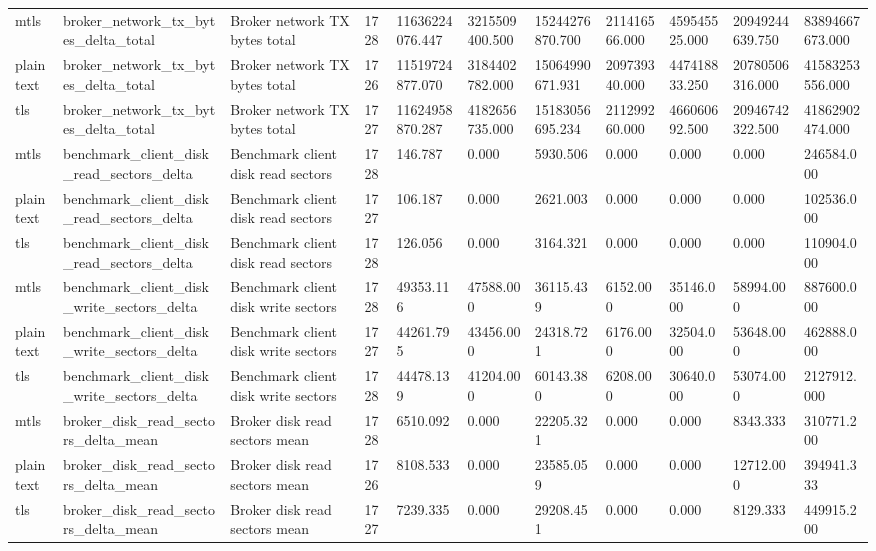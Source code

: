 \begin{longtable}{lllllllllll}
mtls & broker\_network\_tx\_bytes\_delta\_total & Broker network TX bytes total & 1728 & 11636224076.447 & 3215509400.500 & 15244276870.700 & 211416566.000 & 459545525.000 & 20949244639.750 & 83894667673.000 \\
plaintext & broker\_network\_tx\_bytes\_delta\_total & Broker network TX bytes total & 1726 & 11519724877.070 & 3184402782.000 & 15064990671.931 & 209739340.000 & 447418833.250 & 20780506316.000 & 41583253556.000 \\
tls & broker\_network\_tx\_bytes\_delta\_total & Broker network TX bytes total & 1727 & 11624958870.287 & 4182656735.000 & 15183056695.234 & 211299260.000 & 466060692.500 & 20946742322.500 & 41862902474.000 \\
mtls & benchmark\_client\_disk\_read\_sectors\_delta & Benchmark client disk read sectors & 1728 & 146.787 & 0.000 & 5930.506 & 0.000 & 0.000 & 0.000 & 246584.000 \\
plaintext & benchmark\_client\_disk\_read\_sectors\_delta & Benchmark client disk read sectors & 1727 & 106.187 & 0.000 & 2621.003 & 0.000 & 0.000 & 0.000 & 102536.000 \\
tls & benchmark\_client\_disk\_read\_sectors\_delta & Benchmark client disk read sectors & 1728 & 126.056 & 0.000 & 3164.321 & 0.000 & 0.000 & 0.000 & 110904.000 \\
mtls & benchmark\_client\_disk\_write\_sectors\_delta & Benchmark client disk write sectors & 1728 & 49353.116 & 47588.000 & 36115.439 & 6152.000 & 35146.000 & 58994.000 & 887600.000 \\
plaintext & benchmark\_client\_disk\_write\_sectors\_delta & Benchmark client disk write sectors & 1727 & 44261.795 & 43456.000 & 24318.721 & 6176.000 & 32504.000 & 53648.000 & 462888.000 \\
tls & benchmark\_client\_disk\_write\_sectors\_delta & Benchmark client disk write sectors & 1728 & 44478.139 & 41204.000 & 60143.380 & 6208.000 & 30640.000 & 53074.000 & 2127912.000 \\
mtls & broker\_disk\_read\_sectors\_delta\_mean & Broker disk read sectors mean & 1728 & 6510.092 & 0.000 & 22205.321 & 0.000 & 0.000 & 8343.333 & 310771.200 \\
plaintext & broker\_disk\_read\_sectors\_delta\_mean & Broker disk read sectors mean & 1726 & 8108.533 & 0.000 & 23585.059 & 0.000 & 0.000 & 12712.000 & 394941.333 \\
tls & broker\_disk\_read\_sectors\_delta\_mean & Broker disk read sectors mean & 1727 & 7239.335 & 0.000 & 29208.451 & 0.000 & 0.000 & 8129.333 & 449915.200 \\

\end{longtable}
